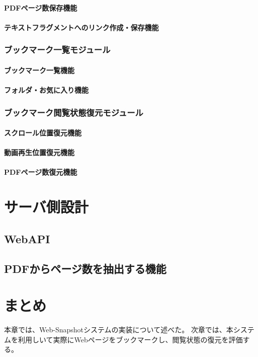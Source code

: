 \paragraph{PDFページ数保存機能}
\paragraph{テキストフラグメントへのリンク作成・保存機能}

\subsubsection{ブックマーク一覧モジュール}
\paragraph{ブックマーク一覧機能}
\paragraph{フォルダ・お気に入り機能}

\subsubsection{ブックマーク閲覧状態復元モジュール}
\paragraph{スクロール位置復元機能}
\paragraph{動画再生位置復元機能}
\paragraph{PDFページ数復元機能}

\section{サーバ側設計}
\subsection{WebAPI}
\subsection{PDFからページ数を抽出する機能}

\section{まとめ}
本章では、Web-Snapshotシステムの実装について述べた。
次章では、本システムを利用しいて実際にWebページをブックマークし、閲覧状態の復元を評価する。